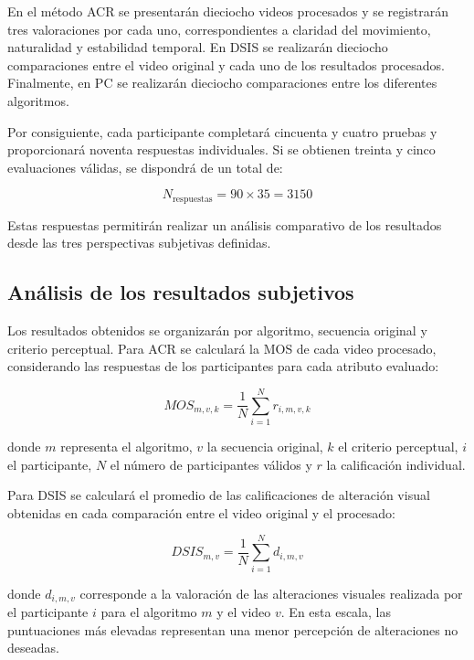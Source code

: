 En el método ACR se presentarán dieciocho videos procesados y se registrarán tres valoraciones por cada uno, correspondientes a claridad del movimiento, naturalidad y estabilidad temporal. En DSIS se realizarán dieciocho comparaciones entre el video original y cada uno de los resultados procesados. Finalmente, en PC se realizarán dieciocho comparaciones entre los diferentes algoritmos.

Por consiguiente, cada participante completará cincuenta y cuatro pruebas y proporcionará noventa respuestas individuales. Si se obtienen treinta y cinco evaluaciones válidas, se dispondrá de un total de:

\begin{equation}
N_{\mathrm{respuestas}}=90\times35=3150
\end{equation}

Estas respuestas permitirán realizar un análisis comparativo de los resultados desde las tres perspectivas subjetivas definidas.

\subsection{Análisis de los resultados subjetivos}

Los resultados obtenidos se organizarán por algoritmo, secuencia original y criterio perceptual. Para ACR se calculará la \gls{MOS} de cada video procesado, considerando las respuestas de los participantes para cada atributo evaluado:

\begin{equation}
MOS_{m,v,k}=
\frac{1}{N}\sum_{i=1}^{N}r_{i,m,v,k}
\end{equation}

donde $m$ representa el algoritmo, $v$ la secuencia original, $k$ el criterio perceptual, $i$ el participante, $N$ el número de participantes válidos y $r$ la calificación individual.

Para DSIS se calculará el promedio de las calificaciones de alteración visual obtenidas en cada comparación entre el video original y el procesado:

\begin{equation}
DSIS_{m,v}=
\frac{1}{N}\sum_{i=1}^{N}d_{i,m,v}
\end{equation}

donde $d_{i,m,v}$ corresponde a la valoración de las alteraciones visuales realizada por el participante $i$ para el algoritmo $m$ y el video $v$. En esta escala, las puntuaciones más elevadas representan una menor percepción de alteraciones no deseadas.

